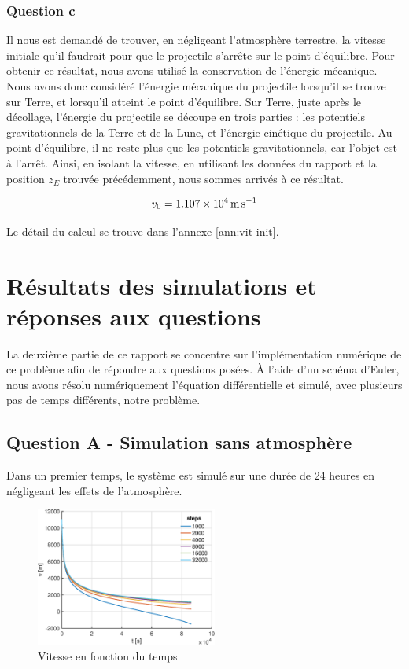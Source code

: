 \documentclass[a4paper,12pt,twoside]{article}
\begin{document}
\subsubsection*{Question c}
Il nous est demandé de trouver, en négligeant l'atmosphère terrestre, la vitesse initiale qu'il faudrait pour que le projectile s'arrête sur le point d'équilibre.
Pour obtenir ce résultat, nous avons utilisé la conservation de l'énergie mécanique.
Nous avons donc considéré l'énergie mécanique du projectile lorsqu'il se trouve sur Terre, et lorsqu'il atteint le point d'équilibre.
Sur Terre, juste après le décollage, l'énergie du projectile se découpe en trois parties :
les potentiels gravitationnels de la Terre et de la Lune, et l'énergie cinétique du projectile.
Au point d'équilibre, il ne reste plus que les potentiels gravitationnels, car l'objet est à l'arrêt.
Ainsi, en isolant la vitesse, en utilisant les données du rapport et la position $z_E$ trouvée précédemment, nous sommes arrivés à ce résultat.

\begin{equation}
    v_0 = \SI{1.107d4}{\meter\per\second}
    \label{val:v0}
\end{equation}

Le détail du calcul se trouve dans l'annexe \ref{ann:vit-init}.\\


\section{Résultats des simulations et réponses aux questions}
La deuxième partie de ce rapport se concentre sur l'implémentation numérique de ce problème afin de répondre aux questions posées.
À l'aide d'un schéma d'Euler, nous avons résolu numériquement l'équation différentielle et simulé, avec plusieurs pas de temps différents, notre problème.

\subsection{Question A - Simulation sans atmosphère}
Dans un premier temps, le système est simulé sur une durée de 24 heures en négligeant les effets de l'atmosphère.

\begin{figure}[h]
	\centering
    \includegraphics[width=0.53\textwidth]{graphs/vA.eps}
    \caption{Vitesse en fonction du temps}
    \label{fig:A-vt}
\end{figure}
\end{document}
